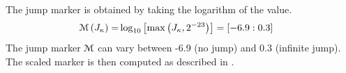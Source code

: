 The jump marker is obtained by taking the logarithm of the value.
\begin{align}
    {\cal M} \left( J_\kappa \right)
 =& \log_{10} \left[ \max \left( J_\kappa , 2^{-23} \right) \right]
 =  \left[ -6.9 : 0.3 \right]
  \label{EQN:JumpMarker}
\end{align}
The jump marker ${\cal M}$ can vary between -6.9 (no jump)
and 0.3 (infinite jump).
%
The scaled marker is then computed as described in .




